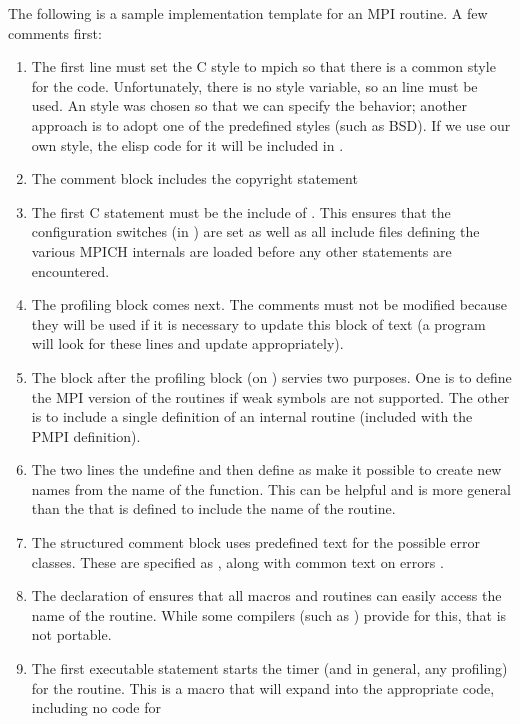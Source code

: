 \documentclass{article}
\begin{document}
The following is a sample implementation template for an MPI routine.
A few comments first:
\begin{enumerate}
\item The first line must set the C style to mpich so that there is a common
      style for the code.  Unfortunately, there is no style variable, so an
       line must be used.  An  style was chosen so that 
      we can specify the behavior; another approach is to adopt one
      of the predefined styles (such as BSD).  If we use our own
      style, the elisp code for it will be included in .
\item The comment block includes the copyright statement
\item The first C statement must be the include of .  This
  ensures that the configuration switches (in ) are set as
  well as all include files defining the various MPICH internals are loaded
  before any other statements are encountered.
\item The profiling block comes next.  The comments must not be modified
  because they will be used if it is necessary to update this block of text (a
  program will look for these lines and update appropriately).
\item The block after the profiling block (on )
  servies two purposes.  One is to define the MPI version of the routines if
  weak symbols are not supported.  The other is to include a single definition
  of an internal routine (included with the PMPI definition).
\item The two lines the undefine  and then define
 as  make it possible to create new names
from the name of the function.  This can be helpful and is more
general than the  that is defined to include
the name of the routine.
\item The structured comment block uses predefined text for the possible error
  classes.  These are specified as , along with common text on
  errors .
\item The declaration of  ensures that all macros and
routines can easily access the name of the routine.  While some
compilers (such as ) provide  for this,
that is not portable.
\item 
The first executable statement starts the timer (and in general,
any profiling) for the routine.  This
  is a macro that will expand into the appropriate code, including no code for

\end{enumerate}
\end{document}
